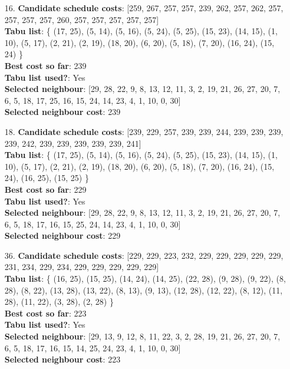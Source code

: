 \documentclass[fleqn]{article}
\begin{document}
\begin{itemize}
    \item[16.] \textbf{Candidate schedule costs}: [259, 267, 257, 257, 239, 262, 257, 262, 257, 257, 257, 257, 260, 257, 257, 257, 257, 257] \\
    \textbf{Tabu list}: \{ (17, 25), (5, 14), (5, 16), (5, 24), (5, 25), (15, 23), (14, 15), (1, 10), (5, 17), (2, 21), (2, 19), (18, 20), (6, 20), (5, 18), (7, 20), (16, 24), (15, 24) \} \\
    \textbf{Best cost so far}: 239 \\
    \textbf{Tabu list used?}: Yes \\
    \textbf{Selected neighbour}: [29, 28, 22, 9, 8, 13, 12, 11, 3, 2, 19, 21, 26, 27, 20, 7, 6, 5, 18, 17, 25, 16, 15, 24, 14, 23, 4, 1, 10, 0, 30] \\
    \textbf{Selected neighbour cost}: 239
      

    \item[18.] \textbf{Candidate schedule costs}: [239, 229, 257, 239, 239, 244, 239, 239, 239, 239, 242, 239, 239, 239, 239, 239, 241] \\
    \textbf{Tabu list}: \{ (17, 25), (5, 14), (5, 16), (5, 24), (5, 25), (15, 23), (14, 15), (1, 10), (5, 17), (2, 21), (2, 19), (18, 20), (6, 20), (5, 18), (7, 20), (16, 24), (15, 24), (16, 25), (15, 25) \} \\
    \textbf{Best cost so far}: 229 \\
    \textbf{Tabu list used?}: Yes \\
    \textbf{Selected neighbour}: [29, 28, 22, 9, 8, 13, 12, 11, 3, 2, 19, 21, 26, 27, 20, 7, 6, 5, 18, 17, 16, 15, 25, 24, 14, 23, 4, 1, 10, 0, 30] \\
    \textbf{Selected neighbour cost}: 229
      

    \item[36.] \textbf{Candidate schedule costs}: [229, 229, 223, 232, 229, 229, 229, 229, 229, 231, 234, 229, 234, 229, 229, 229, 229, 229] \\
    \textbf{Tabu list}: \{ (16, 25), (15, 25), (14, 24), (14, 25), (22, 28), (9, 28), (9, 22), (8, 28), (8, 22), (13, 28), (13, 22), (8, 13), (9, 13), (12, 28), (12, 22), (8, 12), (11, 28), (11, 22), (3, 28), (2, 28) \} \\
    \textbf{Best cost so far}: 223 \\
    \textbf{Tabu list used?}: Yes \\
    \textbf{Selected neighbour}: [29, 13, 9, 12, 8, 11, 22, 3, 2, 28, 19, 21, 26, 27, 20, 7, 6, 5, 18, 17, 16, 15, 14, 25, 24, 23, 4, 1, 10, 0, 30] \\
    \textbf{Selected neighbour cost}: 223
      


\end{itemize}
\end{document}
